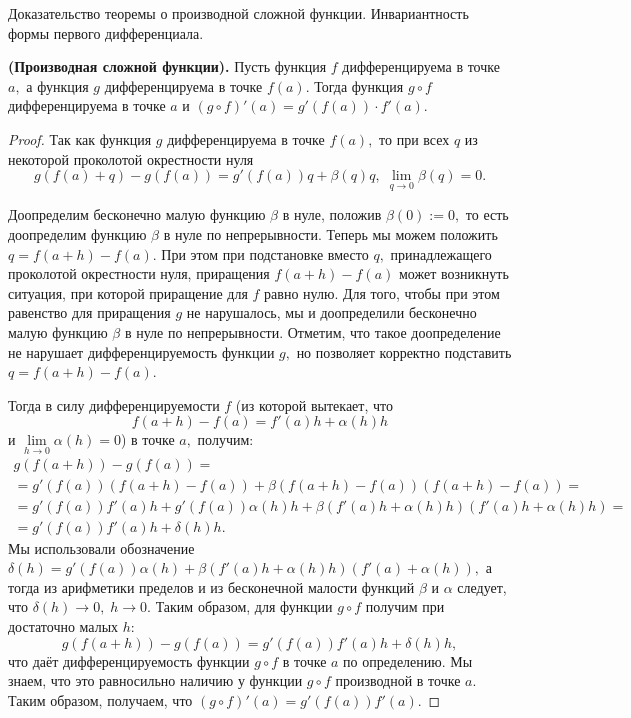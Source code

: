 \begin{problem}
Доказательство теоремы о производной сложной функции. Инвариантность формы
первого дифференциала.
\end{problem}
\begin{proposition}
\textbf{(Производная сложной функции).}
Пусть функция $f$ дифференцируема в точке
$a,$ а функция $g$ дифференцируема в точке
$f(a).$ Тогда функция $g\circ f$ дифференцируема
в точке $a$ и $(g\circ f)'(a)=g'(f(a))\cdot f'(a).$
\end{proposition}
\begin{proof}
Так как функция $g$ дифференцируема в точке
$f(a),$ то при всех $q$ из некоторой
проколотой окрестности нуля
$$
g(f(a)+q)-g(f(a))=g'(f(a))q+\beta(q)q,\;
\lim\limits_{q\rightarrow0}\beta(q)=0.
$$

Доопределим бесконечно малую функцию
$\beta$ в нуле, положив $\beta(0):=0,$
то есть доопределим функцию $\beta$
в нуле по непрерывности.
Теперь мы можем положить
$q=f(a+h)-f(a).$
При этом при подстановке вместо
$q,$ принадлежащего
проколотой окрестности нуля,
приращения $f(a+h)-f(a)$ может возникнуть
ситуация, при которой приращение
для $f$ равно нулю. Для того, чтобы
при этом равенство для приращения $g$
не нарушалось, мы и
доопределили бесконечно малую функцию
$\beta$ в нуле по непрерывности.
Отметим, что такое доопределение не
нарушает дифференцируемость функции $g,$
но позволяет корректно подставить
$q=f(a+h)-f(a).$ 

Тогда
в силу дифференцируемости $f$
(из которой вытекает, что $$f(a+h)-f(a)=
f'(a)h+\alpha(h)h$$ и
$\lim\limits_{h\rightarrow0}\alpha(h)=0$)
в точке $a,$ получим:
\begin{multline*}
g(f(a+h))-g(f(a))=\\
=g'(f(a))(f(a+h)-f(a))+
\beta(f(a+h)-f(a))(f(a+h)-f(a))=\\=
g'(f(a))f'(a)h+g'(f(a))\alpha(h)h+
\beta(f'(a)h+\alpha(h)h)(f'(a)h+\alpha(h)h)=\\
=g'(f(a))f'(a)h+\delta(h)h.
\end{multline*}
Мы использовали обозначение
$\delta(h)=g'(f(a))\alpha(h)+
\beta(f'(a)h+\alpha(h)h)(f'(a)+\alpha(h)),$
а тогда из арифметики пределов и из
бесконечной малости функций $\beta$
и $\alpha$ следует, что $\delta(h)
\rightarrow0,\;h\rightarrow0.$
Таким образом, для функции $g\circ f$
получим при достаточно малых $h:$
$$
g(f(a+h))-g(f(a))=
g'(f(a))f'(a)h+\delta(h)h,
$$
что даёт дифференцируемость
функции $g\circ f$ в точке $a$ по определению.
Мы знаем, что это равносильно
наличию у функции $g\circ f$ производной
в точке $a.$ Таким образом, получаем,
что $(g\circ f)'(a)=
g'(f(a))f'(a).$
\end{proof}
